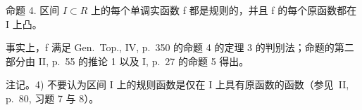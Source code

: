 命题 4. 区间 \(I \subset R\) 上的每个单调实函数 f 都是规则的，并且 f 的每个原函数都在 I 上凸。

事实上，f 满足 Gen.~Top., IV, p.~350 的命题 4 的定理 3 的判别法；命题的第二部分由 II, p.~55 的推论 1 以及 I, p.~27 的命题 5 得出。

注记。4) 不要认为区间 I 上的规则函数是仅在 I 上具有原函数的函数（参见~II, p.~80, 习题 7 与 8）。

